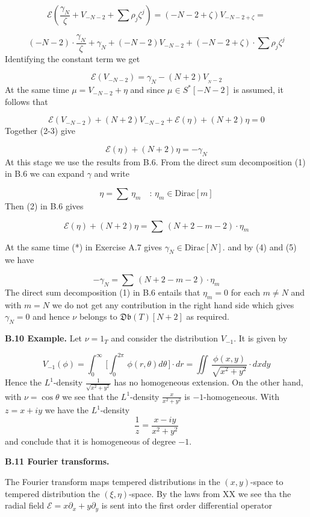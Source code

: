 \[
\mathcal E(\frac{\gamma_N}{\zeta}+V_{-N-2}+\sum\rho_j\zeta^j)=
(-N-2+\zeta)V_{-N-2+\zeta}=
\]


\[ 
(-N-2)\cdot\frac{\gamma_N}{\zeta}+
\gamma_N+(-N-2)V_{-N-2}+(-N-2+\zeta)\cdot \sum\rho_j\zeta^j
\] 
Identifying the constant term we get

\[
\mathcal E(V_{-N-2})=\gamma_N-(N+2)V_{_N-2}\tag{2}
\]
At the same time $\mu=V_{-N-2}+\eta$  and since
$\mu\in S^*[-N-2]$ is assumed, it follows that

\[
\mathcal E(V_{-N-2})+(N+2)V_{-N-2}+
\mathcal E(\eta)+
(N+2)\eta=0 \tag{3}
\]
Together (2-3) give

\[
\mathcal E(\eta)+
(N+2)\eta=
-\gamma_N\tag{4}
\]
At this stage we use the results from B.6. 
From the direct sum decomposition (1) in B.6
we can expand $\gamma$ and write

\[
\eta=\sum\,\eta_m\quad\colon\,\eta_m\in
\text{Dirac}[m]
\]
Then (2) in B.6 gives

\[
\mathcal E(\eta)+
(N+2)\eta=\sum\, (N+2-m-2)\cdot\eta_m\tag{5}
\]
\medskip

\noindent
At the same time
(*) in Exercise A.7 gives
$\gamma_N\in\text{Dirac}[N]$.
and by (4) and (5) we have

\[
-\gamma_N=\sum\, (N+2-m-2)\cdot\eta_m\tag{6}
\]
The direct sum decomposition (1) in B.6 entails that $\eta_m=0$ for each
$m\neq N$ and with $m=N$ we do not get any contribution in
the right hand side which gives $\gamma_N=0$ and hence
$\nu$ belongs to $\mathfrak{Db}(T)[N+2]$ as required.
\bigskip

\noindent
{\bf{B.10 Example.}}
Let $\nu=1_T$ and consider the distribution $V_{-1}$.
It is given by


\[ 
V_{-1}(\phi)= 
\int_0^\infty\,\bigl [\int_0^{2\pi}\, \phi(r,\theta)d\theta \,\bigr]\cdot dr=
\iint\, \frac{\phi(x,y)}{\sqrt{x^2+y^2}}\cdot dxdy
\]
Hence the $L^1$-density $\frac{1}{\sqrt{x^2+y^2}}$ has no homogeneous
extension. On the other hand, with $\nu=\cos\theta$
we see that the $L^1$-density
$\frac{x}{x^2+y^2}$ is $-1$-homogeneous.
With $z=x+iy$ we have the $L^1$-density
\[
\frac{1}{z}= \frac{x-iy}{x^2+y^2}
\] 
and conclude that it is homogeneous of degree $-1$.
\bigskip


\centerline {\bf{B.11 Fourier transforms.}}
\medskip

\noindent
The Fourier transform maps tempered distributions in the $(x,y)$-space 
to tempered distribution the $(\xi,\eta)$-space.
By the laws from XX we see tha the radial field $\mathcal E=x\partial_x+y\partial_y$
is sent into the first order differential operator 

